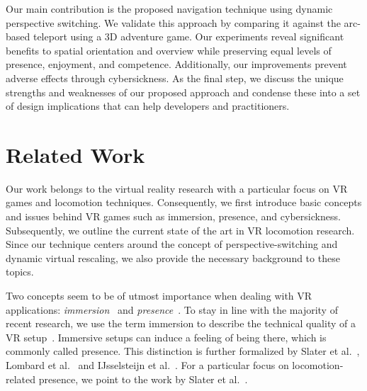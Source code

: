 \documentclass{sigchi}
\newcommand{\comm}[1]{}
\begin{document}
Our main contribution is the proposed navigation technique using dynamic perspective switching. We validate this approach by comparing it against the arc-based teleport using a 3D adventure game. Our experiments reveal significant benefits to spatial orientation and overview while preserving equal levels of presence, enjoyment, and competence. Additionally, our improvements prevent adverse effects through cybersickness. As the final step, we discuss the unique strengths and weaknesses of our proposed approach and condense these into a set of design implications that can help developers and practitioners.\comm{ to use our insights for their purposes.}

\section{Related Work}
Our work belongs to the virtual reality research with a particular focus on VR games and locomotion techniques. Consequently, we first introduce basic concepts and issues behind VR games such as immersion, presence, and cybersickness. Subsequently, we outline the current state of the art in VR locomotion research. Since our technique centers around the concept of perspective-switching and dynamic virtual rescaling, we also provide the necessary background to these topics.\par
Two concepts seem to be of utmost importance when dealing with VR applications: \textit{immersion}~\cite{cairns2014immersion} and \textit{presence}~\cite{heeter1992being}. To stay in line with the majority of recent research, we use the term immersion to describe the technical quality of a VR setup~\cite{Biocca:1995:IVR:207922.207926, sherman2002understanding}. Immersive setups can induce a feeling of being there, which is commonly called presence. This distinction is further formalized by Slater et al.~\cite{slater2003note}, Lombard et al.~\cite{lombard1997heart} and IJsselsteijn et al.~\cite{IJsselsteijn}. For a particular focus on locomotion-related presence, we point to the work by Slater et al.~\cite{slater1995taking}.
\end{document}
